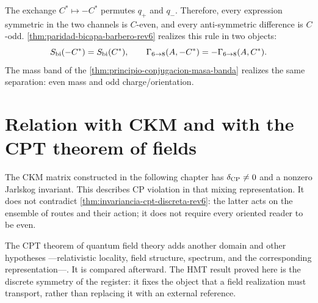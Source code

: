 The exchange \(C^*\mapsto-C^*\) permutes \(q_+\) and \(q_-\). Therefore,
every expression symmetric in the two channels is \(C\)-even, and every
anti-symmetric difference is \(C\)-odd.
\cref{thm:paridad-bicapa-barbero-rev6} realizes this rule in two objects:
\[
 S_{\rm bi}(-C^*)=S_{\rm bi}(C^*),
 \qquad
 \Gamma_{6\to8}(A,-C^*)
 =-\Gamma_{6\to8}(A,C^*).
\]
The mass band of the
\cref{thm:principio-conjugacion-masa-banda} realizes the same separation:
even mass and odd charge/orientation.

\section{Relation with CKM and with the CPT theorem of fields}

The CKM matrix constructed in the following chapter has
\(\delta_{\rm CP}\neq0\) and a nonzero Jarlskog invariant. This describes
CP violation in that mixing representation. It does not contradict
\cref{thm:invariancia-cpt-discreta-rev6}: the latter acts on the
ensemble of routes and their action; it does not require every oriented reader to be even.

The CPT theorem of quantum field theory adds another domain and other hypotheses ---relativistic locality, field structure, spectrum, and the corresponding representation---. It is compared afterward. The HMT result proved here is the discrete symmetry of the register: it fixes the object that a field realization must transport, rather than replacing it with an external reference.
